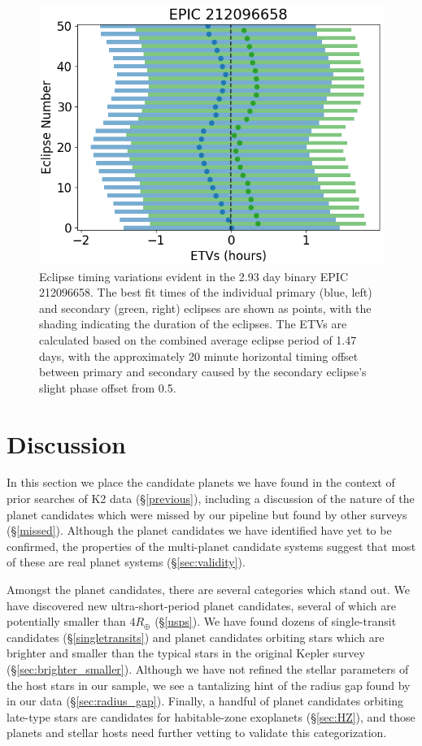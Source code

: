 \documentclass[twocolumn]{aastex62}
\begin{document}
\begin{figure}[tbp]
\includegraphics[width=\columnwidth]{etvs.png}
\caption{Eclipse timing variations evident in the 2.93 day binary EPIC
  212096658. The best fit times of the individual primary (blue, left)
  and secondary (green, right) eclipses are shown as points, with the
  shading indicating the duration of the eclipses. The ETVs are
  calculated based on the combined average eclipse period of 1.47
  days, with the approximately 20 minute horizontal timing offset
  between primary and secondary caused by the secondary eclipse's
  slight phase offset from 0.5. \label{etvs}}
\end{figure}


\section{Discussion}\label{ch:analysis}

In this section we place the candidate planets we have found in the
context of prior searches of K2 data (\S \ref{previous}), including a
discussion of the nature of the planet candidates which were missed by
our pipeline but found by other surveys (\S \ref{missed}).  Although
the planet candidates we have identified have yet to be confirmed, the
properties of the multi-planet candidate systems suggest that most of
these are real planet systems (\S \ref{sec:validity}).

Amongst the planet candidates, there are several categories which
stand out.  We have discovered new ultra-short-period planet
candidates, several of which are potentially smaller than $4 R_\oplus$
(\S \ref{usps}).  We have found dozens of single-transit candidates
(\S \ref{singletransits}) and planet candidates orbiting stars which
are brighter and smaller than the typical stars in the original Kepler
survey (\S \ref{sec:brighter_smaller}).  Although we have not refined
the stellar parameters of the host stars in our sample, we see a
tantalizing hint of the radius gap found by \citet{ful17} in our data
(\S \ref{sec:radius_gap}).  Finally, a handful of planet candidates
orbiting late-type stars are candidates for habitable-zone exoplanets
(\S \ref{sec:HZ}), and those planets and stellar hosts need further
vetting to validate this categorization.
\end{document}
